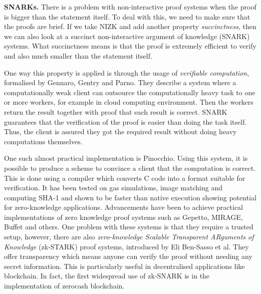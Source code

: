 \documentclass{Resources/UoBLab1}
\theoremstyle{definition}
\begin{document}
\noindent\textbf{SNARKs.} There is a problem with non-interactive proof systems when the proof is bigger than the statement itself. To deal with this, we need to make sure that the proofs are brief. If we take NIZK and add another property \textit{succinctness}, then we can also look at a succinct non-interactive argument of knowledge (SNARK) systems. What succinctness means is that the proof is extremely efficient to verify and also much smaller than the statement itself.

One way this property is applied is through the usage of \textit{verifiable computation}, formalised by Gennaro, Gentry and Parno\cite{UntrustedWorkers}. They describe a system where a computationally weak client can outsource the computationally heavy task to one or more workers, for example in cloud computing environment. Then the workers return the result together with proof that such result is correct. SNARK guarantees that the verification of the proof is easier than doing the task itself. Thus, the client is assured they got the required result without doing heavy computations themselves.

One such almost practical implementation is Pinocchio\cite{Pinocchio}. Using this system, it is possible to produce a scheme to convince a client that the computation is correct. This is done using a compiler which converts C code into a format suitable for verification. It has been tested on gas simulations, image matching and computing SHA-1 and shown to be faster than native execution showing potential for zero-knowledge applications. Advancements have been to achieve practical implementations of zero knowledge proof systems such as Gepetto\cite{Gepetto}, MIRAGE\cite{Mirage}, Buffet\cite{Buffet} and others. One problem with these systems is that they require a trusted setup, however, there are also \textit{zero-knowledge Scalable Transparent ARguments of Knowledge} (zk-STARK) proof systems, introduced by Eli Ben-Sasso et al\cite{STARK}. They offer transparency which means anyone can verify the proof without needing any secret information. This is particularly useful in decentralised applications like blockchain. In fact, the first widespread use of zk-SNARK is in the implementation of zerocash blockchain\cite{zcash}.\medskip
\end{document}
